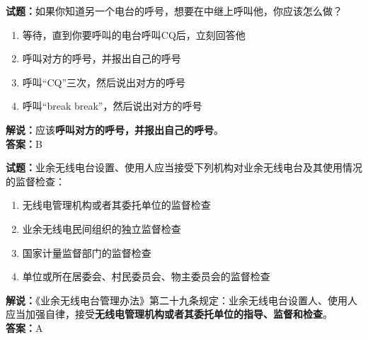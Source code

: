 \documentclass{ctexbook}
\begin{document}
\bigskip

\noindent\textbf{试题：}如果你知道另一个电台的呼号，想要在中继上呼叫他，你应该怎么做？
\begin{enumerate}[leftmargin=3em]
  \item 等待，直到你要呼叫的电台呼叫CQ后，立刻回答他
  \item 呼叫对方的呼号，并报出自己的呼号
  \item 呼叫“CQ”三次，然后说出对方的呼号
  \item 呼叫“break break”，然后说出对方的呼号
\end{enumerate}
\noindent\textbf{解说：}应该\textbf{呼叫对方的呼号，并报出自己的呼号}。\\\noindent\textbf{答案：}B

\bigskip

\noindent\textbf{试题：}业余无线电台设置、使用人应当接受下列机构对业余无线电台及其使用情况的监督检查：
\begin{enumerate}[leftmargin=3em]
  \item 无线电管理机构或者其委托单位的监督检查
  \item 业余无线电民间组织的独立监督检查
  \item 国家计量监督部门的监督检查
  \item 单位或所在居委会、村民委员会、物主委员会的监督检查
\end{enumerate}
\noindent\textbf{解说：}《业余无线电台管理办法》第二十九条规定：业余无线电台设置人、使用人应当加强自律，接受\textbf{无线电管理机构或者其委托单位的指导、监督和检查}。\\\noindent\textbf{答案：}A

\bigskip
\end{document}
